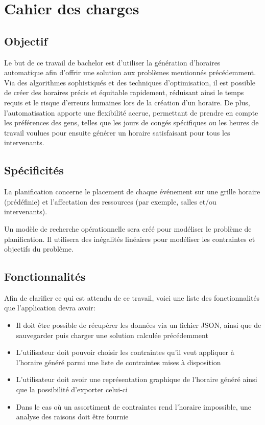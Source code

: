 \section{Cahier des charges}
\subsection{Objectif}
Le but de ce travail de bachelor est d'utiliser la génération d'horaires automatique afin d'offrir une solution aux problèmes mentionnés précédemment. Via des algorithmes sophistiqués et des techniques d'optimisation, il est possible de créer des horaires précis et équitable rapidement, réduisant ainsi le temps requis et le risque d'erreurs humaines lors de la création d'un horaire. De plus, l'automatisation apporte une flexibilité accrue, permettant de prendre en compte les préférences des gens, telles que les jours de congés spécifiques ou les heures de travail voulues pour ensuite générer un horaire satisfaisant pour tous les intervenants.

\subsection{Spécificités}
La planification concerne le placement de chaque événement sur une grille horaire (prédéfinie) et l'affectation des ressources (par exemple, salles et/ou intervenants).

Un modèle de recherche opérationnelle sera créé pour modéliser le problème de planification. Il utilisera des inégalités linéaires pour modéliser les contraintes et objectifs du problème.

\subsection{Fonctionnalités}

Afin de clarifier ce qui est attendu de ce travail, voici une liste des fonctionnalités que l'application devra avoir:

\begin{itemize}
    \item Il doit être possible de récupérer les données via un fichier JSON, ainsi que de sauvegarder puis charger une solution calculée précédemment
    \item L'utilisateur doit pouvoir choisir les contraintes qu'il veut appliquer à l'horaire généré parmi une liste de contraintes mises à disposition
    \item L'utilisateur doit avoir une représentation graphique de l'horaire généré ainsi que la possibilité d'exporter celui-ci
    \item Dans le cas où un assortiment de contraintes rend l'horaire impossible, une analyse des raisons doit être fournie
\end{itemize}

